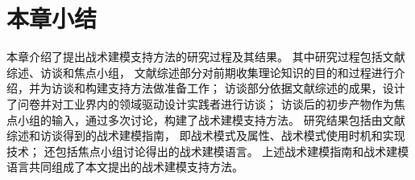 


\section{本章小结}

本章介绍了提出战术建模支持方法的研究过程及其结果。
其中研究过程包括文献综述、访谈和焦点小组，
文献综述部分对前期收集理论知识的目的和过程进行介绍，并为访谈和构建支持方法做准备工作；
访谈部分依据文献综述的成果，设计了问卷并对工业界内的领域驱动设计实践者进行访谈；
访谈后的初步产物作为焦点小组的输入，通过多次讨论，构建了战术建模支持方法。
研究结果包括由文献综述和访谈得到的战术建模指南，
即战术模式及属性、战术模式使用时机和实现技术；
还包括焦点小组讨论得出的战术建模语言。
上述战术建模指南和战术建模语言共同组成了本文提出的战术建模支持方法。




